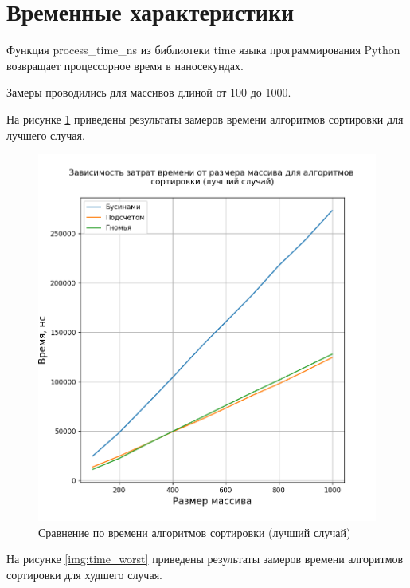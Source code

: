\section{Временные характеристики}

Функция process\_time\_ns из библиотеки time языка программирования Python возвращает  процессорное время в наносекундах.

Замеры проводились для массивов длиной от 100 до 1000.

На рисунке \ref{img:time_best} приведены результаты замеров времени алгоритмов сортировки для лучшего случая.

\begin{figure}[H]
	\begin{center}
		\includegraphics[scale=0.67]{img/time_best.png}
	\end{center}
	\captionsetup{justification=centering}
	\caption{Сравнение по времени алгоритмов сортировки (лучший случай)}
	\label{img:time_best}
\end{figure}

На рисунке \ref{img:time_worst} приведены результаты замеров времени алгоритмов сортировки для худшего случая.

